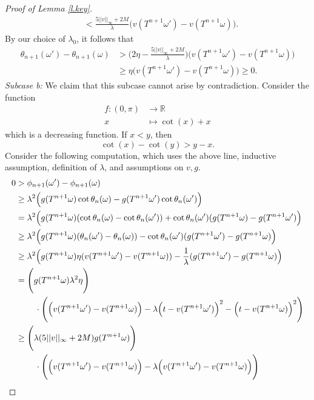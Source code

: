 \documentclass{amsart}
\newcommand{\RR}{\mathbb{R}}
\begin{document}
\begin{proof}[Proof of Lemma \ref{l.key}]
\begin{align*}
        &< \frac{5||v||_\infty + 2M}{\lambda}\Big(v(T^{n+1}\omega') - v(T^{n+1}\omega)\Big).
    \end{align*}
    By our choice of $\lambda_0$, it follows that
    \begin{align}
        \theta_{n+1}(\omega') - \theta_{n+1}(\omega) &> \Big(2\eta - \frac{5||v||_\infty + 2M}{\lambda}\Big) \Big(v(T^{n+1}\omega') - v(T^{n+1}\omega)\Big) \label{e.2.ii.a}\\
        &\geq \eta \Big(v(T^{n+1}\omega') - v(T^{n+1}\omega)\Big)\geq 0. \nonumber
    \end{align}
    \textit{Subcase b:} We claim that this subcase cannot arise by contradiction. Consider the function
    \begin{align*}
        f: (0,\pi) &\rightarrow \RR\\
        x &\mapsto \cot(x) + x
    \end{align*}
    which is a decreasing function. If $x<y$, then
    \[\cot(x) - \cot(y) > y - x.\]
    Consider the following computation, which uses the above line, inductive assumption, definition of $\lambda$, and assumptions on $v,g$.
    \begin{align*}
        0 &>\phi_{n+1}(\omega') - \phi_{n+1}(\omega)\\
        &\geq \lambda^2\Big(g(T^{n+1}\omega) \cot\theta_{n}(\omega) - g(T^{n+1}\omega') \cot\theta_{n}(\omega') \Big)\\
        &= \lambda^2 \Big(g(T^{n+1}\omega) (\cot\theta_{n}(\omega) - \cot\theta_{n}(\omega')) + \cot\theta_{n}(\omega') ( g(T^{n+1}\omega) -  g(T^{n+1}\omega') \Big)\\
        &\geq \lambda^2 \Big(g(T^{n+1}\omega) (\theta_{n}(\omega') - \theta_{n}(\omega)) - \cot\theta_{n}(\omega') ( g(T^{n+1}\omega') -  g(T^{n+1}\omega) \Big)\\
        &\geq \lambda^2 \Big(g(T^{n+1}\omega)\eta ( v(T^{n+1}\omega') - v(T^{n+1}\omega) )- \frac{1}{\lambda} ( g(T^{n+1}\omega') -  g(T^{n+1}\omega) \Big)\\
        &= \Bigg(g(T^{n+1}\omega)\lambda^2\eta\Bigg) \\
        &\hspace{8mm}\cdot\Bigg(\Big(v(T^{n+1}\omega') - v(T^{n+1}\omega)\Big) - \lambda\Big(t-v(T^{n+1}\omega')\Big)^2 - \Big(t-v(T^{n+1}\omega)\Big)^2\Bigg)\\
        &\geq \Bigg(\lambda(5||v||_\infty+2M)g(T^{n+1}\omega)\Bigg) \\
        &\hspace{8mm}\cdot \Bigg(\Big(v(T^{n+1}\omega') - v(T^{n+1}\omega)\Big)- \lambda \Big(v(T^{n+1}\omega') - v(T^{n+1}\omega)\Big)\Bigg) \\

\end{align*}
\end{proof}
\end{document}
